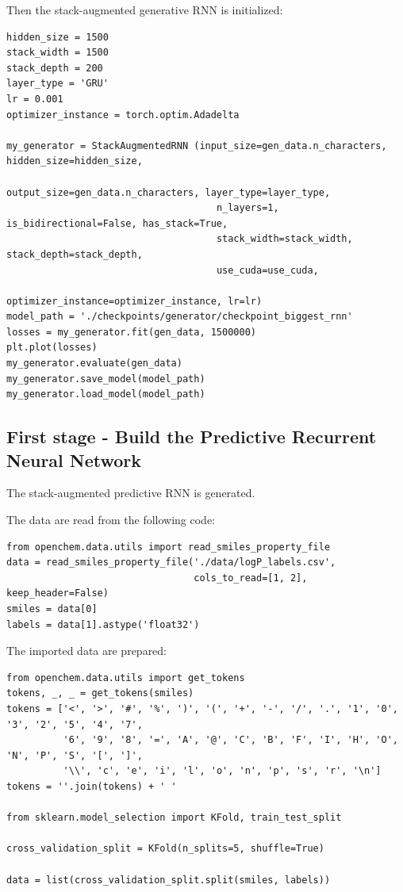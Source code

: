 \documentclass[a4paper]{article}
\begin{document}
Then the stack-augmented generative RNN is initialized:

\begin{lstlisting}
hidden_size = 1500
stack_width = 1500
stack_depth = 200
layer_type = 'GRU'
lr = 0.001
optimizer_instance = torch.optim.Adadelta

my_generator = StackAugmentedRNN (input_size=gen_data.n_characters, hidden_size=hidden_size,
									 output_size=gen_data.n_characters, layer_type=layer_type,
									 n_layers=1, is_bidirectional=False, has_stack=True,
									 stack_width=stack_width, stack_depth=stack_depth, 
									 use_cuda=use_cuda, 
									 optimizer_instance=optimizer_instance, lr=lr)
model_path = './checkpoints/generator/checkpoint_biggest_rnn'
losses = my_generator.fit(gen_data, 1500000)
plt.plot(losses)
my_generator.evaluate(gen_data)
my_generator.save_model(model_path)
my_generator.load_model(model_path)
\end{lstlisting}

\subsection{First stage - Build the Predictive Recurrent Neural Network}\label{sec:First stage - Build the Predictive Recurrent Neural Network}

The stack-augmented predictive RNN is generated. 

The data are read from the following code:

\begin{lstlisting}
from openchem.data.utils import read_smiles_property_file
data = read_smiles_property_file('./data/logP_labels.csv', 
                                 cols_to_read=[1, 2], keep_header=False)
smiles = data[0]
labels = data[1].astype('float32')
\end{lstlisting}

The imported data are prepared:

\begin{lstlisting}
from openchem.data.utils import get_tokens
tokens, _, _ = get_tokens(smiles)
tokens = ['<', '>', '#', '%', ')', '(', '+', '-', '/', '.', '1', '0', '3', '2', '5', '4', '7',
          '6', '9', '8', '=', 'A', '@', 'C', 'B', 'F', 'I', 'H', 'O', 'N', 'P', 'S', '[', ']',
          '\\', 'c', 'e', 'i', 'l', 'o', 'n', 'p', 's', 'r', '\n']
tokens = ''.join(tokens) + ' '

from sklearn.model_selection import KFold, train_test_split

cross_validation_split = KFold(n_splits=5, shuffle=True)

data = list(cross_validation_split.split(smiles, labels))
\end{lstlisting}
\end{document}

